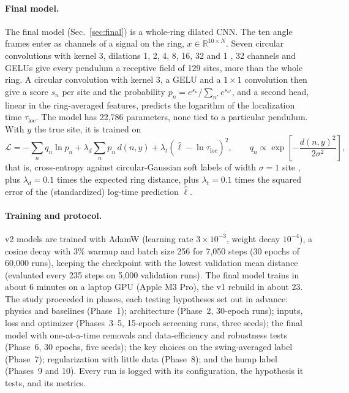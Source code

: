 \documentclass[11pt]{article}
\begin{document}
\paragraph{Final model.} The final model (Sec.~\ref{sec:final}) is a whole-ring dilated CNN. The ten angle frames enter as channels of a signal on the ring, $x\in\mathbb{R}^{10\times N}$. Seven circular convolutions with kernel 3, dilations 1, 2, 4, 8, 16, 32 and 1 \cite{yu2016multiscale,oord2016wavenet}, 32 channels and GELUs give every pendulum a receptive field of 129 sites, more than the whole ring. A circular convolution with kernel 3, a GELU and a $1\times1$ convolution then give a score $s_n$ per site and the probability $p_n=e^{s_n}/\sum_{n'}e^{s_{n'}}$, and a second head, linear in the ring-averaged features, predicts the logarithm of the localization time $\tau_{\mathrm{loc}}$. The model has 22,786 parameters, none tied to a particular pendulum. With $y$ the true site, it is trained on
\begin{equation}
\label{eq:loss}
\mathcal{L} = -\sum_n q_n\ln p_n + \lambda_d\sum_n p_n\, d(n,y) + \lambda_t\left(\hat\ell-\ln\tau_{\mathrm{loc}}\right)^2,
\qquad q_n\propto\exp\!\left[-\frac{d(n,y)^2}{2\sigma^2}\right],
\end{equation}
that is, cross-entropy against circular-Gaussian soft labels of width $\sigma=1$ site \cite{szegedy2016rethinking}, plus $\lambda_d=0.1$ times the expected ring distance, plus $\lambda_t=0.1$ times the squared error of the (standardized) log-time prediction $\hat\ell$.

\paragraph{Training and protocol.} v2 models are trained with AdamW \cite{loshchilov2019decoupled} (learning rate $3\times10^{-3}$, weight decay $10^{-4}$), a cosine decay \cite{loshchilov2017sgdr} with 3\% warmup and batch size 256 for 7,050 steps (30 epochs of 60,000 runs), keeping the checkpoint with the lowest validation mean distance (evaluated every 235 steps on 5,000 validation runs). The final model trains in about 6 minutes on a laptop GPU (Apple M3 Pro), the v1 rebuild in about 23. The study proceeded in phases, each testing hypotheses set out in advance: physics and baselines (Phase~1); architecture (Phase~2, 30-epoch runs); inputs, loss and optimizer (Phases~3--5, 15-epoch screening runs, three seeds); the final model with one-at-a-time removals and data-efficiency and robustness tests (Phase~6, 30 epochs, five seeds); the key choices on the swing-averaged label (Phase~7); regularization with little data (Phase~8); and the hump label (Phases~9 and 10). Every run is logged with its configuration, the hypothesis it tests, and its metrics.
\end{document}
